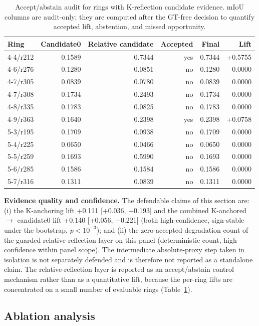 \documentclass[a4paper,fleqn]{cas-dc}
\begin{document}
\begin{table}[!t]
\caption{Accept/abstain audit for rings with K-reflection candidate evidence. mIoU columns are audit-only; they are computed after the GT-free decision to quantify accepted lift, abstention, and missed opportunity.}
\label{tab:relative-decisions}
\centering
\small
\begin{tabular}{lrrrrr}
\toprule
Ring & Candidate0 & Relative candidate & Accepted & Final & Lift \\
\midrule
4-4/r212 & 0.1589 & 0.7344 & yes & 0.7344 & +0.5755 \\
4-6/r276 & 0.1280 & 0.0851 & no & 0.1280 & 0.0000 \\
4-7/r305 & 0.0839 & 0.0780 & no & 0.0839 & 0.0000 \\
4-7/r308 & 0.1734 & 0.2493 & no & 0.1734 & 0.0000 \\
4-8/r335 & 0.1783 & 0.0825 & no & 0.1783 & 0.0000 \\
4-9/r363 & 0.1640 & 0.2398 & yes & 0.2398 & +0.0758 \\
5-3/r195 & 0.1709 & 0.0938 & no & 0.1709 & 0.0000 \\
5-4/r225 & 0.0650 & 0.0466 & no & 0.0650 & 0.0000 \\
5-5/r259 & 0.1693 & 0.5990 & no & 0.1693 & 0.0000 \\
5-6/r285 & 0.1586 & 0.1584 & no & 0.1586 & 0.0000 \\
5-7/r316 & 0.1311 & 0.0839 & no & 0.1311 & 0.0000 \\
\bottomrule
\end{tabular}
\end{table}

\textbf{Evidence quality and confidence.} The defendable claims of this section are: (i) the K-anchoring lift +0.111 [+0.036, +0.193] and the combined K-anchored $\to$ candidate0 lift +0.140 [+0.056, +0.221] (both high-confidence, sign-stable under the bootstrap, $p<10^{-3}$); and (ii) the zero-accepted-degradation count of the guarded relative-reflection layer on this panel (deterministic count, high-confidence within panel scope). The intermediate absolute-proxy step taken in isolation is not separately defended and is therefore not reported as a standalone claim. The relative-reflection layer is reported as an accept/abstain control mechanism rather than as a quantitative lift, because the per-ring lifts are concentrated on a small number of evaluable rings (Table~\ref{tab:relative-decisions}).

\subsection{Ablation analysis}\label{sec:ablation}
\end{document}
